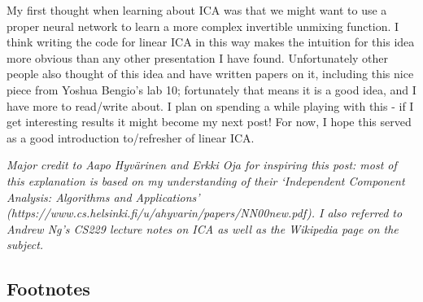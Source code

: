 \documentclass[11pt]{article}
\begin{document}
My first thought when learning about ICA was that we might want to use a
proper neural network to learn a more complex invertible unmixing
function. I think writing the code for linear ICA in this way makes the
intuition for this idea more obvious than any other presentation I have
found. Unfortunately other people also thought of this idea and have
written papers on it, including this nice piece from Yoshua Bengio's lab
10; fortunately that means it is a good idea, and I have more to
read/write about. I plan on spending a while playing with this - if I
get interesting results it might become my next post! For now, I hope
this served as a good introduction to/refresher of linear ICA.

    \emph{Major credit to Aapo Hyvärinen and Erkki Oja for inspiring this
post: most of this explanation is based on my understanding of their
`Independent Component Analysis: Algorithms and Applications'
(https://www.cs.helsinki.fi/u/ahyvarin/papers/NN00new.pdf). I also
referred to Andrew Ng's CS229 lecture notes on ICA as well as the
Wikipedia page on the subject.}

    \hypertarget{footnotes}{%
\subsection{Footnotes}\label{footnotes}}
\end{document}
